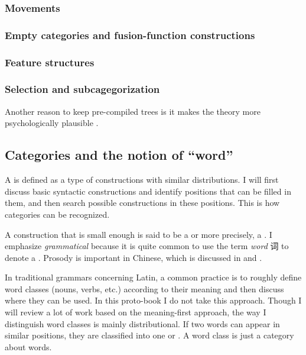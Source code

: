 \documentclass[../main.tex]{subfiles}
\begin{document}
\subsubsection{Movements}

\subsubsection{Empty categories and fusion-function constructions}

\subsubsection{Feature structures}

\subsubsection{Selection and subcagegorization}\label{sec:sub-cat}

Another reason to keep pre-compiled trees is it makes the theory more psychologically plausible \citep{brain-syntax-1,brain-syntax-2}.

\subsection{Categories and the notion of ``word''}

A  is defined as a type of constructions with similar distributions.
I will first discuss basic syntactic constructions and identify positions that can be filled in them, 
and then search possible constructions in these positions. This is how categories can be recognized.

A construction that is small enough is said to be a  or more precisely, 
a .
I emphasize \emph{grammatical} because it is quite common to use the term \emph{word} 词 to denote 
a . Prosody is important in Chinese, which is discussed in 
 and . 

In traditional grammars concerning Latin, a common practice is to roughly define word classes (nouns, verbs, etc.) 
according to their meaning and then discuss where they can be used. 
In this proto-book I do not take this approach. Though I will review a lot of work based on the meaning-first 
approach, the way I distinguish word classes is mainly distributional. If two words can appear in similar
positions, they are classified into one  or .
A word class is just a category about words.  
\end{document}
